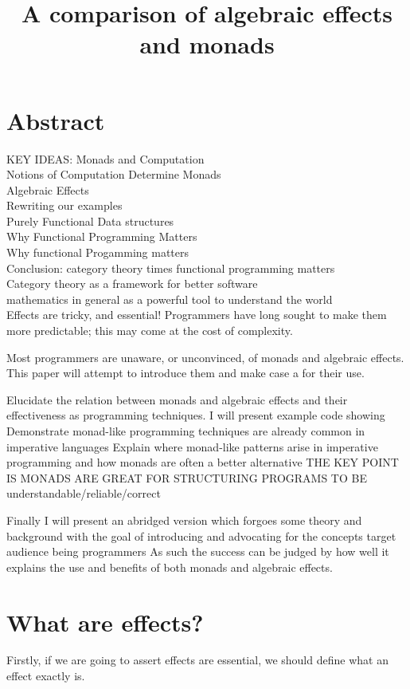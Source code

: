 \documentclass[a4paper,10pt]{article}
\title{A comparison of algebraic effects and monads}
\theoremstyle{definition}
\begin{document}
\section{Abstract}

KEY IDEAS:
Monads and Computation\\
Notions of Computation Determine Monads\\
Algebraic Effects\\
Rewriting our examples\\
Purely Functional Data structures\\
Why Functional Programming Matters\\
Why functional Progamming matters\\
Conclusion: category theory times functional programming matters\\
Category theory as a framework for better software\\
mathematics in general as a powerful tool to understand the world\\


Effects are tricky, and essential!
Programmers have long sought to make them more predictable;
this may come at the cost of complexity.

Most programmers are unaware, or unconvinced, of monads and algebraic effects.
This paper will attempt to introduce them and make case a for their use.

Elucidate the relation between monads and algebraic effects
and their effectiveness as programming techniques.
I will present example code showing
Demonstrate monad-like programming techniques are already common in imperative languages
Explain where monad-like patterns arise in imperative programming and how monads are often a better alternative
THE KEY POINT IS MONADS ARE GREAT FOR STRUCTURING PROGRAMS TO BE understandable/reliable/correct

Finally I will present an abridged version which forgoes some theory and background
with the goal of introducing and advocating for the concepts
target audience being programmers
As such the success can be judged by how well it explains the use and benefits of both monads and algebraic effects.

\pagebreak
\tableofcontents
\pagebreak

\section{What are effects?}
Firstly, if we are going to assert effects are essential,
we should define what an effect exactly is.
\end{document}
